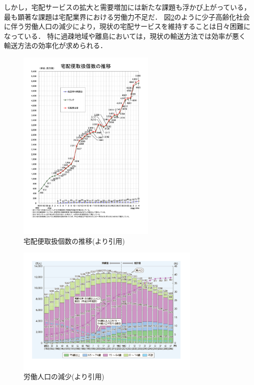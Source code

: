 \documentclass[a4paper, titlepage]{jsarticle}
\begin{document}
しかし，宅配サービスの拡大と需要増加には新たな課題も浮かび上がっている，最も顕著な課題は宅配業界における労働力不足だ．
図\ref{fig:working_population}のように少子高齢化社会に伴う労働人口の減少により，現状の宅配サービスを維持することは日々困難になっている．
特に過疎地域や離島においては，現状の輸送方法では効率が悪く輸送方法の効率化が求められる．
\begin{figure}[H]
  \centering
  \includegraphics[width=0.6\textwidth]{./home_delivery.pdf}
  \caption{宅配便取扱個数の推移(\cite{home_delivery_2022}より引用)}
  \label{fig:home_delivery}
\end{figure}
\begin{figure}[H]
  \centering
  \includegraphics[width=0.8\textwidth]{./working_population.pdf}
  \caption{労働人口の減少(\cite{working_population_2022}より引用)}
  \label{fig:working_population}
\end{figure}
\end{document}

